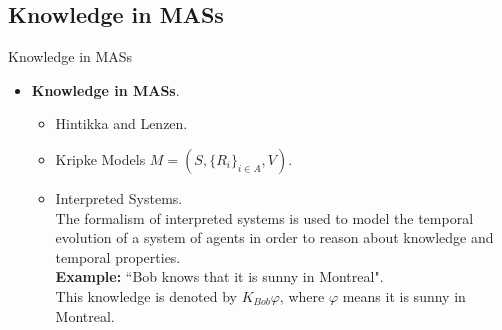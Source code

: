 \documentclass{beamer}
\begin{document}
\subsection{Knowledge in MASs}
    \begin{frame}{Knowledge in MASs}

        \begin{itemize}
            \itemsep=.35cm
        	\item \textbf{Knowledge in MASs}.

             \begin{itemize}
              \item Hintikka and Lenzen.
              \item Kripke Models $M = (S, \{R_i\}_{i \in A}, V)$.
              \item Interpreted Systems.\\
              The formalism of interpreted systems is used to model the temporal evolution of a system of agents in order to reason about knowledge and temporal properties.\\
\textbf{Example:} ``Bob knows that it is sunny in Montreal".\\
This knowledge is denoted by $K_{Bob} \varphi$, where $\varphi$ means it is sunny in Montreal.
            \end{itemize}
        	      	
        \end{itemize}


    \end{frame}
\end{document}
